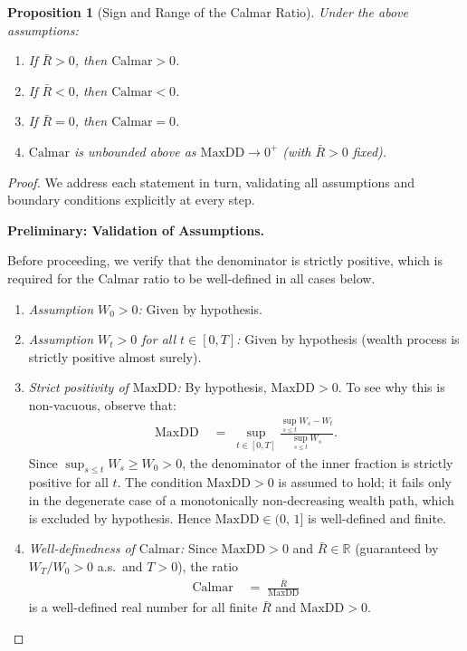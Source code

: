 \documentclass[12pt,openany]{book}
\newcommand{\MaxDD}{\mathrm{MaxDD}}
\numberwithin{equation}{chapter}
\theoremstyle{plain}
\newtheorem{proposition}[theorem]{Proposition}
\theoremstyle{definition}
\theoremstyle{remark}
\numberwithin{equation}{chapter}
\theoremstyle{plain}
\begin{document}
\begin{proposition}[Sign and Range of the Calmar Ratio]
\label{prop:calmar-sign}
Under the above assumptions:
\begin{enumerate}
  \item If $\bar{R} > 0$, then $\mathrm{Calmar} > 0$.
  \item If $\bar{R} < 0$, then $\mathrm{Calmar} < 0$.
  \item If $\bar{R} = 0$, then $\mathrm{Calmar} = 0$.
  \item $\mathrm{Calmar}$ is unbounded above as
        $\MaxDD \to 0^{+}$ (with $\bar{R} > 0$ fixed).
\end{enumerate}
\end{proposition}

\begin{proof}
We address each statement in turn, validating all assumptions
and boundary conditions explicitly at every step.

\medskip
\noindent\textbf{Preliminary: Validation of Assumptions.}

\noindent Before proceeding, we verify that the denominator
is strictly positive, which is required for the Calmar ratio
to be well-defined in all cases below.

\begin{enumerate}
  \item \emph{Assumption $W_0 > 0$:} Given by hypothesis.
  \item \emph{Assumption $W_t > 0$ for all $t \in [0,T]$:}
        Given by hypothesis (wealth process is strictly
        positive almost surely).
  \item \emph{Strict positivity of $\MaxDD$:}
        By hypothesis, $\MaxDD > 0$.  To see why this
        is non-vacuous, observe that:
        \begin{align}
          \MaxDD
            &\;=\; \sup_{t \in [0,T]}
                   \frac{\sup_{s \leq t} W_s - W_t}
                        {\sup_{s \leq t} W_s}.
          \label{eq:calmar-proof-mdd}
        \end{align}
        Since $\sup_{s \leq t} W_s \geq W_0 > 0$, the
        denominator of the inner fraction is strictly
        positive for all $t$.  The condition $\MaxDD > 0$
        is assumed to hold; it fails only in the degenerate
        case of a monotonically non-decreasing wealth path,
        which is excluded by hypothesis.  Hence
        $\MaxDD \in (0,\,1]$ is well-defined and finite.

  \item \emph{Well-definedness of $\mathrm{Calmar}$:}
        Since $\MaxDD > 0$ and $\bar{R} \in \mathbb{R}$
        (guaranteed by $W_T/W_0 > 0$ a.s.\ and
        $T > 0$), the ratio
        \begin{align}
          \mathrm{Calmar}
            &\;=\; \frac{\bar{R}}{\MaxDD}
          \label{eq:calmar-proof-def}
        \end{align}
        is a well-defined real number for all finite
        $\bar{R}$ and $\MaxDD > 0$.
\end{enumerate}


\end{proof}
\end{document}
